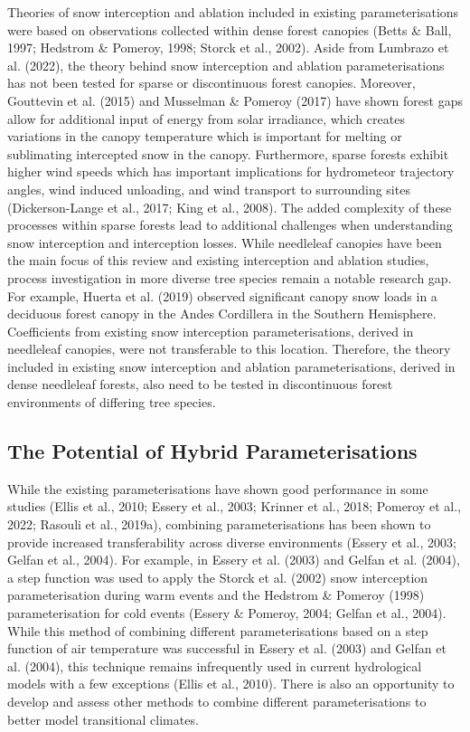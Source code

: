 \documentclass[
  letterpaper,
]{tex/uofsthesis-cs}
\begin{document}
Theories of snow interception and ablation included in existing
parameterisations were based on observations collected within dense
forest canopies (Betts \& Ball, 1997; Hedstrom \& Pomeroy, 1998; Storck
et al., 2002). Aside from Lumbrazo et al. (2022), the theory behind snow
interception and ablation parameterisations has not been tested for
sparse or discontinuous forest canopies. Moreover, Gouttevin et al.
(2015) and Musselman \& Pomeroy (2017) have shown forest gaps allow for
additional input of energy from solar irradiance, which creates
variations in the canopy temperature which is important for melting or
sublimating intercepted snow in the canopy. Furthermore, sparse forests
exhibit higher wind speeds which has important implications for
hydrometeor trajectory angles, wind induced unloading, and wind
transport to surrounding sites (Dickerson-Lange et al., 2017; King et
al., 2008). The added complexity of these processes within sparse
forests lead to additional challenges when understanding snow
interception and interception losses. While needleleaf canopies have
been the main focus of this review and existing interception and
ablation studies, process investigation in more diverse tree species
remain a notable research gap. For example, Huerta et al. (2019)
observed significant canopy snow loads in a deciduous forest canopy in
the Andes Cordillera in the Southern Hemisphere. Coefficients from
existing snow interception parameterisations, derived in needleleaf
canopies, were not transferable to this location. Therefore, the theory
included in existing snow interception and ablation parameterisations,
derived in dense needleleaf forests, also need to be tested in
discontinuous forest environments of differing tree species.

\subsection{The Potential of Hybrid
Parameterisations}\label{the-potential-of-hybrid-parameterisations}

While the existing parameterisations have shown good performance in some
studies (Ellis et al., 2010; Essery et al., 2003; Krinner et al., 2018;
Pomeroy et al., 2022; Rasouli et al., 2019a), combining
parameterisations has been shown to provide increased transferability
across diverse environments (Essery et al., 2003; Gelfan et al., 2004).
For example, in Essery et al. (2003) and Gelfan et al. (2004), a step
function was used to apply the Storck et al. (2002) snow interception
parameterisation during warm events and the Hedstrom \& Pomeroy (1998)
parameterisation for cold events (Essery \& Pomeroy, 2004; Gelfan et
al., 2004). While this method of combining different parameterisations
based on a step function of air temperature was successful in Essery et
al. (2003) and Gelfan et al. (2004), this technique remains infrequently
used in current hydrological models with a few exceptions (Ellis et al.,
2010). There is also an opportunity to develop and assess other methods
to combine different parameterisations to better model transitional
climates.
\end{document}
